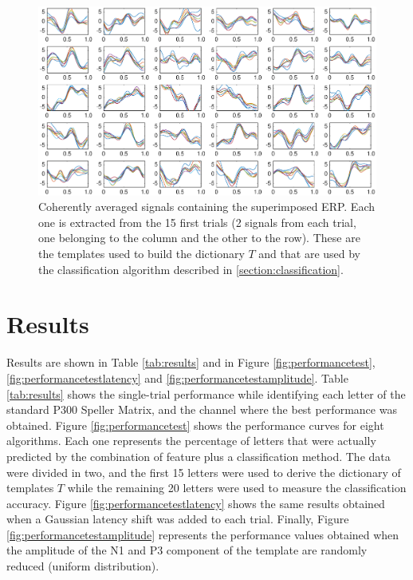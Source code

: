 \documentclass[sensors,article,submit,moreauthors,pdftex,10pt,a4paper]{mdpi}
\begin{document}

\begin{figure}[H]
\centering
\includegraphics[width=15cm]{images/dictionary.eps}
\caption{Coherently averaged signals containing the superimposed ERP.  Each one is extracted from the 15 first trials (2 signals from each trial, one belonging to the column and the other to the row).  These are the templates used to build the dictionary $T$ and that are used by the classification algorithm described in \ref{section:classification}.}
\label{fig:dictionaryfig}
\end{figure}


\section{Results}
\label{section:results}

Results are shown in Table \ref{tab:results} and in Figure \ref{fig:performancetest},\ref{fig:performancetestlatency} and \ref{fig:performancetestamplitude}.  Table \ref{tab:results} shows the single-trial performance while identifying each letter of the standard P300 Speller Matrix, and the channel where the best performance was obtained.   Figure \ref{fig:performancetest} shows the performance curves for eight algorithms.  Each one represents the percentage of letters that were actually predicted by the combination of feature plus a classification method.  The data were divided in two, and the first 15 letters were used to derive the dictionary of templates $T$ while the remaining 20 letters were used to measure the classification accuracy.   Figure \ref{fig:performancetestlatency} shows the same results obtained when a Gaussian latency shift was added to each trial.   Finally, Figure \ref{fig:performancetestamplitude} represents the performance values obtained when the amplitude of the N1 and P3 component of the template are randomly reduced (uniform distribution).
\end{document}

